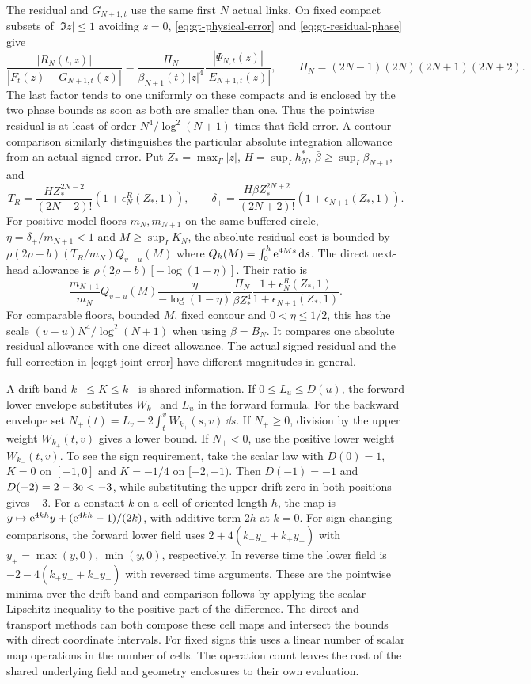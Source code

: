 The residual and \(G_{N+1,t}\) use the same first \(N\) actual
links. On fixed compact subsets of \(|\Im z|\le1\) avoiding
\(z=0\), \eqref{eq:gt-physical-error} and
\eqref{eq:gt-residual-phase} give
\[
 \frac{|R_N(t,z)|}{|F_t(z)-G_{N+1,t}(z)|}
 =\frac{\Pi_N}{\beta_{N+1}(t)|z|^4}
     \frac{|\Psi_{N,t}(z)|}{|E_{N+1,t}(z)|},
 \qquad \Pi_N=(2N-1)(2N)(2N+1)(2N+2).
\]
The last factor tends to one uniformly on these compacts and is
enclosed by the two phase bounds as soon as both are smaller than
one. Thus the pointwise residual is at least of order
\(N^4/\log^2(N+1)\) times that field error. A contour comparison
similarly distinguishes the particular absolute integration allowance
from an actual signed error. Put \(Z_*=\max_\Gamma|z|\),
\(H=\sup_I h_N^*\), \(\bar\beta\ge\sup_I\beta_{N+1}\), and
\[
 T_R=\frac{HZ_*^{2N-2}}{(2N-2)!}(1+\epsilon_N^R(Z_*,1)),\qquad
 \delta_+=\frac{H\bar\beta Z_*^{2N+2}}{(2N+2)!}
               (1+\epsilon_{N+1}(Z_*,1)).
\]
For positive model floors \(m_N,m_{N+1}\) on the same buffered
circle, \(\eta=\delta_+/m_{N+1}<1\) and
\(M\ge\sup_I K_N\), the absolute residual cost is bounded by
\(\rho(2\rho-b)(T_R/m_N)Q_{v-u}(M)\) where
\(Q_h(M)=\int_0^h\mathrm e^{4Ms}\,\mathrm d s\). The direct next-head allowance
is \(\rho(2\rho-b)[-\log(1-\eta)]\). Their ratio is
\[
 \frac{m_{N+1}}{m_N}Q_{v-u}(M)
 \frac{\eta}{-\log(1-\eta)}
 \frac{\Pi_N}{\bar\beta Z_*^4}
 \frac{1+\epsilon_N^R(Z_*,1)}{1+\epsilon_{N+1}(Z_*,1)} .
\]
For comparable floors, bounded \(M\), fixed contour and
\(0<\eta\le1/2\), this has the scale
\((v-u)N^4/\log^2(N+1)\) when using \(\bar\beta=B_N\).
It compares one absolute residual allowance with one direct
allowance. The actual signed residual and the full correction
in \eqref{eq:gt-joint-error} have different magnitudes in general.

A drift band \(k_-\le K\le k_+\) is shared information. If
\(0\le L_u\le D(u)\), the forward lower envelope substitutes
\(W_{k_-}\) and \(L_u\) in the forward formula. For the backward
envelope set \(N_+(t)=L_v-2\int_t^v W_{k_+}(s,v)\,\dd s\).
If \(N_+\ge0\), division by the upper weight \(W_{k_+}(t,v)\)
gives a lower bound. If \(N_+<0\), use the positive lower weight
\(W_{k_-}(t,v)\). To see the sign requirement, take the scalar
law with \(D(0)=1\), \(K=0\) on \([-1,0]\) and \(K=-1/4\) on
\([-2,-1)\). Then \(D(-1)=-1\) and \(D(-2)=2-3\mathrm e<-3\), while
substituting the upper drift zero in both positions gives \(-3\).
For a constant \(k\) on a cell of oriented length \(h\), the map is
\(y\mapsto \mathrm e^{4kh}y+(\mathrm e^{4kh}-1)/(2k)\), with additive term
\(2h\) at \(k=0\). For sign-changing comparisons, the forward
lower field uses \(2+4(k_-y_++k_+y_-)\) with \(y_\pm=\max(y,0)\),
\(\min(y,0)\), respectively. In reverse time the lower field is
\(-2-4(k_+y_++k_-y_-)\) with reversed time arguments. These are
the pointwise minima over the drift band and comparison follows
by applying the scalar Lipschitz inequality to the positive
part of the difference. The direct and transport methods can both
compose these cell maps and intersect the bounds with direct
coordinate intervals. For fixed signs this uses a linear number
of scalar map operations in the number of cells. The operation
count leaves the cost of the shared underlying field and geometry
enclosures to their own evaluation.

